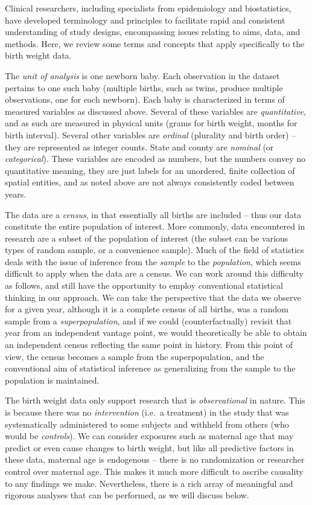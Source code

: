 Clinical researchers, including specialists from epidemiology and biostatistics, have developed terminology and principles to facilitate rapid and consistent understanding of study designs, encompassing issues relating to aims, data, and methods.  Here, we review some terms and concepts that apply specifically to the birth weight data.

The {\em unit of analysis} is one newborn baby.  Each observation in the dataset pertains to one such baby (multiple births, such as twins, produce multiple observations, one for each newborn).  Each baby is characterized in terms of measured variables as discussed above.  Several of these variables are {\em quantitative}, and as such are measured in physical units (grams for birth weight, months for birth interval).  Several other variables are {\em ordinal} (plurality and birth order) -- they are represented as integer counts.  State and county are {\em nominal} (or {\em categorical}).  These variables are encoded as numbers, but the numbers convey no quantitative meaning, they are just labels for an unordered, finite collection of spatial entities, and as noted above are not always consistently coded between years.

The data are a {\em census}, in that essentially all births are included -- thus our data constitute the entire population of interest. More commonly, data encountered in research are a subset of the population of interest (the subset can be various types of random sample, or a convenience sample).  Much of the field of statistics deals with the issue of inference from the {\em sample} to the {\em population}, which seems difficult to apply when the data are a census.  We can work around this difficulty as follows, and still have the opportunity to employ conventional statistical thinking in our approach.  We can take the perspective that the data we observe for a given year, although it is a complete census of all births, was a random sample from a {\em superpopulation}, and if we could (counterfactually) revisit that year from an independent vantage point, we would theoretically be able to obtain an independent census reflecting the same point in history.  From this point of view, the census becomes a sample from the superpopulation, and the conventional aim of statistical inference as generalizing from the sample to the population is maintained.

The birth weight data only support research that is {\em observational} in nature.  This is because there was no {\em intervention} (i.e.\ a treatment) in the study that was systematically administered to some subjects and withheld from others (who would be {\em controls}).  We can consider exposures such as maternal age that may predict or even cause changes to birth weight, but like all predictive factors in these data, maternal age is endogenous -- there is no randomization or researcher control over maternal age.  This makes it much more difficult to ascribe causality to any findings we make.  Nevertheless, there is a rich array of meaningful and rigorous analyses that can be performed, as we will discuss below.

